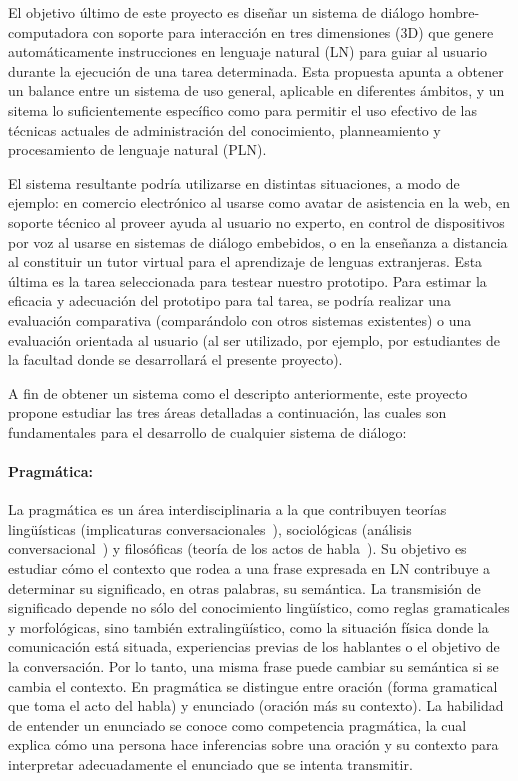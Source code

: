 
El objetivo \'ultimo de este proyecto es dise\~nar un sistema de di\'alogo hombre-computadora con soporte para interacci\'on en tres dimensiones (3D) que genere autom\'aticamente instrucciones en lenguaje natural (LN) para guiar  al usuario durante la ejecuci\'on de una tarea determinada. Esta propuesta apunta
a obtener un balance entre un sistema de uso general, aplicable en
diferentes \'ambitos, y un sitema lo suficientemente espec\'ifico
como para permitir el uso efectivo de las t\'ecnicas actuales de
administraci\'on del conocimiento, planneamiento y procesamiento de lenguaje natural (PLN).

El sistema resultante podr\'ia utilizarse en distintas situaciones, a modo de ejemplo:
en comercio electr\'onico  al usarse como avatar de asistencia en la web, en soporte t\'ecnico al proveer ayuda al usuario no experto, en
control de dispositivos por voz al usarse en sistemas de di\'alogo embebidos, o
en la ense\~nanza a distancia al constituir un tutor virtual para el aprendizaje de lenguas extranjeras. Esta \'ultima es la tarea seleccionada para testear nuestro prototipo. Para estimar la eficacia y adecuaci\'on del prototipo para tal tarea, se podr\'ia realizar una evaluaci\'on comparativa (compar\'andolo con otros sistemas existentes) o una evaluaci\'on orientada al usuario (al ser utilizado, por ejemplo, por estudiantes de la facultad donde se desarrollar\'a el presente proyecto).


A fin de obtener un sistema como el descripto anteriormente, este proyecto propone estudiar las tres \'areas detalladas a continuaci\'on, las cuales son  fundamentales para el desarrollo de cualquier sistema de di\'alogo:

\paragraph{Pragm\'atica:} La pragm\'atica es un \'area interdisciplinaria a
la que contribuyen teor\'ias ling\"u\'isticas (implicaturas
conversacionales~\citep{Grice75}), sociol\'ogicas (an\'alisis
conversa\-cio\-nal~\citep{schegloff87b}) y filos\'oficas (teor\'ia de los actos
de habla~\citep{austin62}). Su objetivo es estudiar c\'omo el contexto que rodea a una frase expresada en LN
contribuye a determinar su significado, en otras palabras, su sem\'antica. La transmisi\'on de significado depende no s\'olo del
conocimiento ling\"u\'istico, como reglas gramaticales y morfol\'ogicas, sino
tambi\'en extraling\"u\'istico, como la situaci\'on f\'isica donde la comunicaci\'on
est\'a situada, experiencias previas de los hablantes o el objetivo de la
conversaci\'on. Por lo tanto, una misma frase puede cambiar su sem\'antica si se cambia el contexto.  En
pragm\'atica se distingue entre oraci\'on (forma
gramatical que toma el acto del habla) y enunciado (oraci\'on m\'as su contexto). La habilidad de entender un enunciado se conoce como competencia pragm\'atica, la cual explica c\'omo una persona hace
inferencias sobre una oraci\'on y su contexto para interpretar adecuadamente el enunciado que se intenta transmitir.

